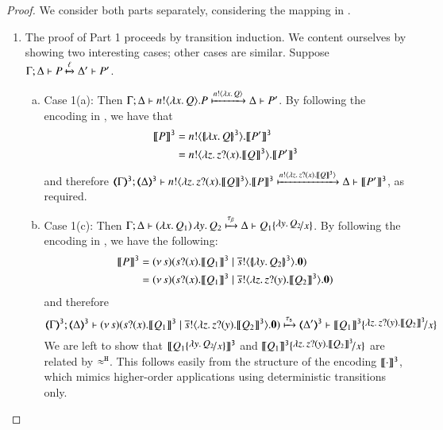 \begin{proof}
We consider both parts separately,
considering the mapping in .

\begin{enumerate}
	\item The proof of Part 1 proceeds by transition induction. We 
		content ourselves by showing two interesting cases; other cases are similar.  
		Suppose $\Gamma; \Delta \vdash P \xmapsto{\ell} \Delta' \vdash P'$.

	\begin{enumerate}[a)]
	
			\item	%
			Case 1(a): 
			Then 
			$\Gamma; \Delta \vdash n ! \langle \lambda x.\,Q \rangle . P \xmapsto{ n !\langle \lambda x.\,Q \rangle} \Delta \vdash P'$.
By following the encoding in , we have 
that 
\begin{align*}
\llbracket P\rrbracket^\mathtt{3} & = n ! \langle \{\!|\lambda x.\,Q|\!\}^\mathtt{3} \rangle . \llbracket P'\rrbracket^\mathtt{3} \\
& = n ! \langle \lambda z.\,z ? (x) . \llbracket Q\rrbracket^\mathtt{3} \rangle . \llbracket P'\rrbracket^\mathtt{3}
\end{align*}
and therefore
 			$\horel{\tmap{\Gamma}{3}}{\tmap{\Delta}{3}}{\bout{n}{\abs{z} \binp{z}{x} \pmap{Q}{3}} \pmap{P}{3}}{\hby{ \bactout{n}{\abs{z}{\binp{z}{x} \pmap{Q}{3}} } }}{\Delta}{\pmap{P'}{3}}$,
			as required.

		\item	%
		Case 1(c): Then 
$\horel{\Gamma}{\Delta}{\appl{(\abs{x}{Q_1})}{\abs{y}{Q_2}}}{\hby{\btau}}{\Delta}{Q_1 \subst{\abs{y}{Q_2}}{x}}$.
By following the encoding in , we have the following: 
\begin{align*}
\llbracket P\rrbracket^\mathtt{3} & = (\nu\, s)(s ? (x) . \llbracket Q_1\rrbracket^\mathtt{3} \;|\; \overline{s} ! \langle \{\!|\lambda y.\,Q_2|\!\}^\mathtt{3} \rangle .\mathbf{0}) \\
& = (\nu\, s)(s ? (x) . \llbracket Q_1\rrbracket^\mathtt{3} \;|\; \overline{s} ! \langle \lambda z.\,z ? (y) .\llbracket Q_2\rrbracket^\mathtt{3} \rangle .\mathbf{0}) 
\end{align*}
and therefore
\[
			\horel{\tmap{\Gamma}{3}}{\tmap{\Delta}{3}}{\newsp{s}{\binp{s}{x} \pmap{Q_1}{3} \Par \bout{\dual{s}}{\abs{z}{\binp{z}{y}\pmap{Q_2}{3}}} \inact}}{\hby{\stau}}
			{\tmap{\Delta'}{3}}{\pmap{Q_1}{3} \subst{\abs{z}{\binp{z}{y}\pmap{Q_2}{3}}}{x}}
\]
We are left to show that $\pmap{Q_1 \subst{\abs{y}{Q_2}}{x}}{3}$ 
and $\pmap{Q_1}{3} \subst{\abs{z}{\binp{z}{y}\pmap{Q_2}{3}}}{x}$ are related by $\approx^\mathtt{H}$.
This follows easily from the structure of the encoding $\llbracket\cdot\rrbracket^\mathtt{3}$, 
which mimics higher-order applications using deterministic transitions only.



\end{enumerate}
\end{enumerate}
\end{proof}
